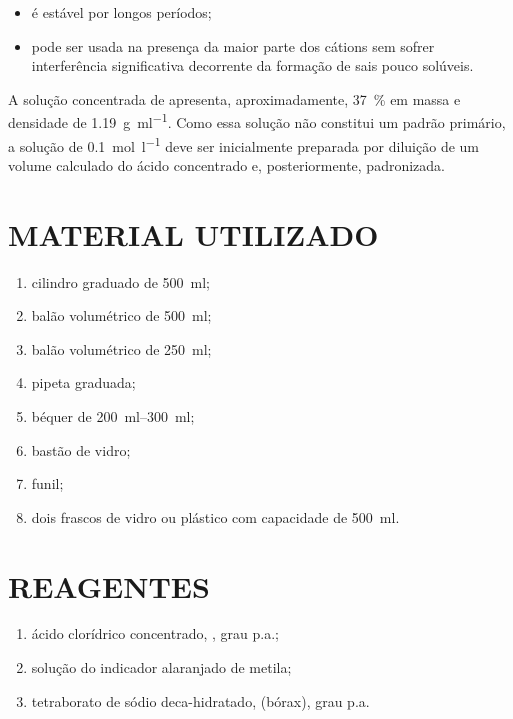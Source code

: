 \documentclass[a4paper,12pt]{article}
\begin{document}
\begin{itemize}
    \item é estável por longos períodos;
    \item pode ser usada na presença da maior parte dos cátions sem sofrer interferência significativa decorrente da formação de sais pouco solúveis.
\end{itemize}

A solução concentrada de  apresenta, aproximadamente, \qty{37}{\percent} em massa e densidade de \qty{1.19}{\gram\per\milli\litre}. Como essa solução não constitui um padrão primário, a solução de  \qty{0.1}{\mole\per\litre} deve ser inicialmente preparada por diluição de um volume calculado do ácido concentrado e, posteriormente, padronizada.

\section{MATERIAL UTILIZADO}

\begin{enumerate}[label=\alph*.]
    \item cilindro graduado de \qty{500}{\milli\litre};
    \item balão volumétrico de \qty{500}{\milli\litre};
    \item balão volumétrico de \qty{250}{\milli\litre};
    \item pipeta graduada;
    \item béquer de \qtyrange{200}{300}{\milli\litre};
    \item bastão de vidro;
    \item funil;
    \item dois frascos de vidro ou plástico com capacidade de \qty{500}{\milli\litre}.
\end{enumerate}

\section{REAGENTES}

\begin{enumerate}[label=\alph*.]
    \item ácido clorídrico concentrado, , grau p.a.;
    \item solução do indicador alaranjado de metila;
    \item tetraborato de sódio deca-hidratado,  (bórax), grau p.a.
\end{enumerate}
\end{document}
